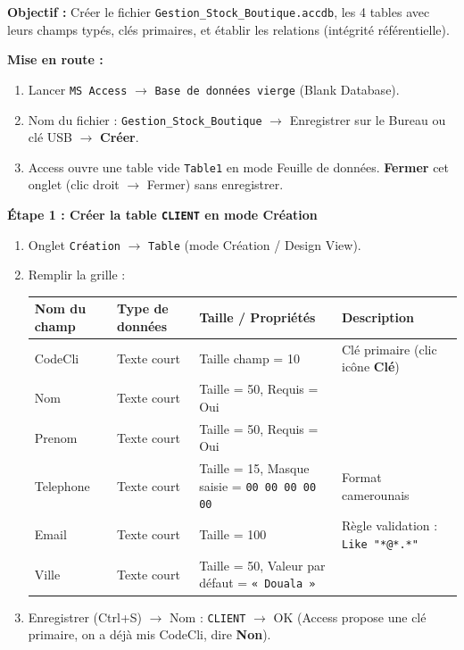 \documentclass[11pt]{article}
\begin{document}
\begin{experience}
\textbf{Objectif :} Créer le fichier \texttt{Gestion\_Stock\_Boutique.accdb}, les 4 tables avec leurs champs typés, clés primaires, et établir les relations (intégrité référentielle).

\textbf{Mise en route :}
\begin{enumerate}
    \item Lancer \texttt{MS Access} $\rightarrow$ \texttt{Base de données vierge} (Blank Database).
    \item Nom du fichier : \texttt{Gestion\_Stock\_Boutique} $\rightarrow$ Enregistrer sur le Bureau ou clé USB $\rightarrow$ \textbf{Créer}.
    \item Access ouvre une table vide \texttt{Table1} en mode Feuille de données. \textbf{Fermer} cet onglet (clic droit $\rightarrow$ Fermer) sans enregistrer.
\end{enumerate}

\textbf{Étape 1 : Créer la table \texttt{CLIENT} en mode Création}
\begin{enumerate}
    \item Onglet \texttt{Création} $\rightarrow$ \texttt{Table} (mode Création / Design View).
    \item Remplir la grille :
    \begin{center}
    \begin{tabular}{|l|l|l|l|}
    \hline \textbf{Nom du champ} & \textbf{Type de données} & \textbf{Taille / Propriétés} & \textbf{Description} \\ \hline
    CodeCli & Texte court & Taille champ = 10 & Clé primaire (clic icône \textbf{Clé}) \\
    Nom & Texte court & Taille = 50, Requis = Oui & \\
    Prenom & Texte court & Taille = 50, Requis = Oui & \\
    Telephone & Texte court & Taille = 15, Masque saisie = \texttt{00 00 00 00 00} & Format camerounais \\
    Email & Texte court & Taille = 100 & Règle validation : \texttt{Like "*@*.*"} \\
    Ville & Texte court & Taille = 50, Valeur par défaut = \texttt{« Douala »} & \\ \hline
    \end{tabular}
    \end{center}
    \item Enregistrer (Ctrl+S) $\rightarrow$ Nom : \texttt{CLIENT} $\rightarrow$ OK (Access propose une clé primaire, on a déjà mis CodeCli, dire \textbf{Non}).
\end{enumerate}


\end{experience}
\end{document}
